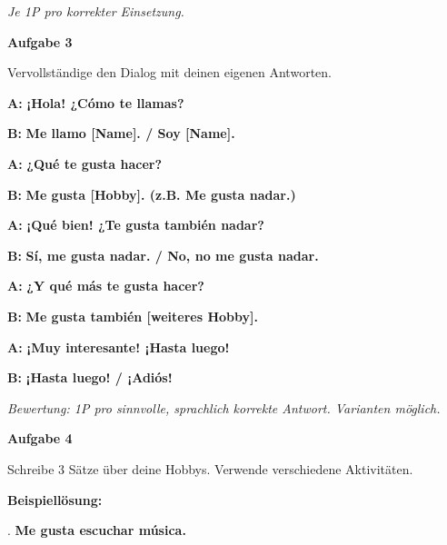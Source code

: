 \documentclass[11pt, a4paper]{article}
\newcommand{\fachfarbe}{spanisch}
\newcommand{\punktebox}[1]{\hfill\fbox{\small \_/#1}}
\newcommand{\loesung}[1]{\textcolor{loesung}{\textbf{#1}}}
\newenvironment{aufgabe}[1]{%
    \needspace{5\baselineskip}%
    \nopagebreak[4]%
    \vspace{10pt}
    \noindent\textbf{\textcolor{\fachfarbe}{Aufgabe #1}}
    \nopagebreak[4]%
    \vspace{5pt}
    \nopagebreak[4]%
    \begin{list}{}{\leftmargin=0pt}
    \item[]
}{%
    \end{list}
}
\newcommand{\es}[1]{\textcolor{\fachfarbe}{\textbf{#1}}}
\begin{document}
\vspace{0.5em}
\textit{\textcolor{grau}{Je 1P pro korrekter Einsetzung.}}

\vspace{15pt}


\begin{aufgabe}{3}
Vervollständige den Dialog mit deinen eigenen Antworten. \punktebox{5}
\end{aufgabe}

\noindent
\textbf{A:} \es{¡Hola! ¿Cómo te llamas?}

\textbf{B:} \loesung{Me llamo [Name]. / Soy [Name].}

\textbf{A:} \es{¿Qué te gusta hacer?}

\textbf{B:} \loesung{Me gusta [Hobby]. (z.B. Me gusta nadar.)}

\textbf{A:} \es{¡Qué bien! ¿Te gusta también nadar?}

\textbf{B:} \loesung{Sí, me gusta nadar. / No, no me gusta nadar.}

\textbf{A:} \es{¿Y qué más te gusta hacer?}

\textbf{B:} \loesung{Me gusta también [weiteres Hobby].}

\textbf{A:} \es{¡Muy interesante! ¡Hasta luego!}

\textbf{B:} \loesung{¡Hasta luego! / ¡Adiós!}

\vspace{0.5em}
\textit{\textcolor{grau}{Bewertung: 1P pro sinnvolle, sprachlich korrekte Antwort. Varianten möglich.}}

\vspace{15pt}


\begin{aufgabe}{4}
Schreibe 3 Sätze über deine Hobbys. Verwende verschiedene Aktivitäten. \punktebox{6}
\end{aufgabe}

\textbf{Beispiellösung:}

. \loesung{Me gusta escuchar música.}

\vspace{0.5em}
\end{document}
